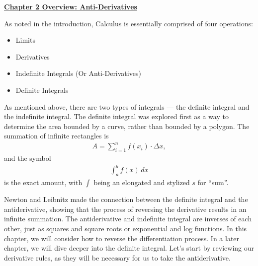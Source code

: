 \textbf{\underline{\large{Chapter 2 Overview: Anti-Derivatives}}} \par

As noted in the introduction, Calculus is essentially comprised of four operations: \begin{itemize}
    \item Limits
    \item Derivatives
    \item Indefinite Integrals (Or Anti-Derivatives)
    \item Definite Integrals
\end{itemize}

As mentioned above, there are two types of integrals --- the definite integral and the indefinite integral. The definite integral was explored first as a way to determine the area bounded by a curve, rather than bounded by a polygon. The summation of infinite rectangles is \begin{align*}
    A = \sum_{i = 1}^n f\left(x_i\right) \cdot \Delta x,
\end{align*}
and the symbol \begin{align*}
    \int_a^b f(x) \, dx
\end{align*}
is the exact amount, with $\int$ being an elongated and stylized $s$ for ``sum''. \par

Newton and Leibnitz made the connection between the definite integral and the antiderivative, showing that the process of reversing the derivative results in an infinite summation. The antiderivative and indefinite integral are inverses of each other, just as squares and square roots or exponential and log functions. In this chapter, we will consider how to reverse the differentiation process. In a later chapter, we will dive deeper into the definite integral. Let's start by reviewing our derivative rules, as they will be necessary for us to take the antiderivative. \par

